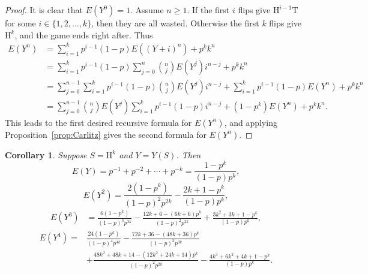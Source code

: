 \documentclass[10pt]{amsart}
\newtheorem{corollary}[theorem]{Corollary}
\theoremstyle{definition}
\theoremstyle{remark}
\newcommand{\HH}{\mathrm{H}} \newcommand{\TT}{\mathrm{T}}
\begin{document}
\begin{proof}
It is clear that $E(Y^0)=1$. Assume $n\ge1$.
If the first $i$ flips give $\HH^{i-1}\TT$ for some $i\in\{1,2,\ldots,k\}$, then they are all wasted.
Otherwise the first $k$ flips give $\HH^k$, and the game ends right after.
Thus
\begin{align*}
E(Y^n) &= \sum_{i=1}^k p^{i-1}(1-p) E((Y+i)^n) + p^k k^n \\
&= \sum_{i=1}^k p^{i-1}(1-p) \sum_{j=0}^n \binom{n}{j} E(Y^j) i^{n-j} + p^k k^n \\
&=  \sum_{j=0}^{n-1} \sum_{i=1}^k p^{i-1}(1-p) \binom{n}{j} E(Y^j) i^{n-j} 
+ \sum_{i=1}^k p^{i-1}(1-p) E(Y^n) + p^k k^n  \\
&=  \sum_{j=0}^{n-1} \binom{n}{j} E(Y^j) \sum_{i=1}^k p^{i-1}(1-p) i^{n-j} 
+ (1-p^k) E(Y^n) + p^k k^n.
\end{align*}
This leads to the first desired recursive formula for $E(Y^n)$, and applying Proposition~\ref{prop:Carlitz} gives the second formula for $E(Y^n)$.
\end{proof}


\begin{corollary}\label{cor:Hk}
Suppose $S=\HH^k$ and $Y=Y(S)$. 
Then
\[ 
E(Y) = p^{-1} + p^{-2} + \cdots + p^{-k} = \frac{1-p^k}{(1-p)p^k},
\]
\[ 
E(Y^2) %
= \frac{2(1-p^k)}{(1-p)^2 p^{2k}} - \frac{2k+1-p^k}{(1-p)p^k},
\]
\begin{align*}
E(Y^3) %
&= \frac{6(1-p^k)}{(1-p)^3 p^{3k}} - \frac{12k+6-(6k+6)p^k}{(1-p)^2 p^{2k}} 
+ \frac{3k^2+3k+1-p^k}{(1-p)p^k},
\end{align*}
\begin{align*}
E(Y^4) =&  \frac{24(1-p^k)}{(1-p)^4 p^{4k}} - \frac{72k+36-(48k+36)p^k}{(1-p)^3 p^{3k}} \\
& + \frac{48k^2+48k+14-(12k^2+24k+14)p^k}{(1-p)^2 p^{2k}} 
- \frac{4k^3+6k^2+4k+1-p^k}{(1-p) p^k}.
\end{align*}
\end{corollary}
\end{document}
